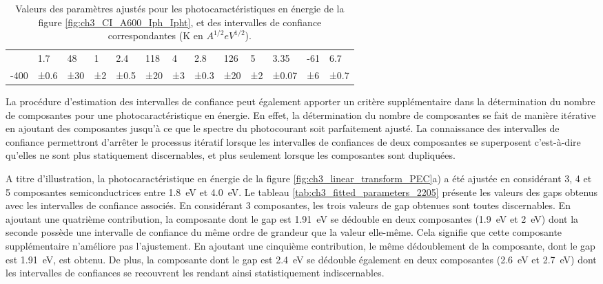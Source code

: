 \begin{refsection}
\begin{table}[H]
\begin{footnotesize}
\begin{tabular}{l|lll|lll|lll|lll}
             & 1.7 & 48 & 1 & 2.4 & 118 & 4 & 2.8 & 126 & 5 & 3.35 &  -61 & 6.7 \\
             \multirow{-2}{*}{-400} & ±0.6 & ±30 & ±2 & ±0.5 & ±20 & ±3 & ±0.3 & ±20 & ±2 & ±0.07 & ±6 & ±0.7 \\
             \bottomrule
        \end{tabular}
        \end{footnotesize}
        \caption[Valeurs des paramètres ajustés pour les photocaractéristiques en énergie de
        la figure \ref{fig:ch3_CI_A600_Iph_Ipht}, et des intervalles de confiance correspondantes.]
        {Valeurs des paramètres ajustés pour les photocaractéristiques en énergie de
        la figure \ref{fig:ch3_CI_A600_Iph_Ipht}, et des intervalles de confiance correspondantes (K en $A^{1/2} eV^{1/2}$).}
        \label{tab:ch3_fitted_parameters_A600_CI}
    \end{table}


    La procédure d'estimation des intervalles de confiance peut également
    apporter un critère supplémentaire dans la détermination du nombre de composantes pour une photocaractéristique en
    énergie. En effet, la détermination du nombre de composantes se fait de manière itérative en ajoutant des composantes
    jusqu'à ce que le spectre du photocourant soit parfaitement ajusté. 
    La connaissance des intervalles de confiance
    permettront d'arrêter le processus itératif lorsque les intervalles de confiances de deux
    composantes se superposent c'est-à-dire qu'elles ne sont plus statiquement discernables, et plus seulement lorsque
    les composantes sont dupliquées.
    
    A titre d'illustration, la photocaractéristique en énergie de la figure \ref{fig:ch3_linear_transform_PEC}a)
    a été ajustée en considérant 3, 4 et 5 composantes semiconductrices entre 
    \SI{1.8}{\electronvolt} et \SI{4.0}{\electronvolt}. 
    Le tableau \ref{tab:ch3_fitted_parameters_2205} présente les
    valeurs des gaps obtenus avec les intervalles de confiance associés. En considérant 3 composantes, les
    trois valeurs de gap obtenues sont toutes discernables. En ajoutant une quatrième contribution, la composante dont le
    gap est \SI{1.91}{\electronvolt} se dédouble en deux composantes (\SI{1.9}{\electronvolt} et \SI{2}{\electronvolt})
    dont la seconde possède une intervalle de confiance du même ordre de grandeur que la valeur elle-même. Cela signifie que
    cette composante supplémentaire n'améliore pas l'ajustement. En ajoutant une cinquième contribution, le même
    dédoublement de la composante, dont le gap est \SI{1.91}{\electronvolt}, est obtenu. De plus, la composante dont le
    gap est \SI{2.4}{\electronvolt} se dédouble également en deux composantes (\SI{2.6}{\electronvolt} et
    \SI{2.7}{\electronvolt}) dont les intervalles de confiances se recouvrent les rendant ainsi statistiquement
    indiscernables. 
    


\end{refsection}

